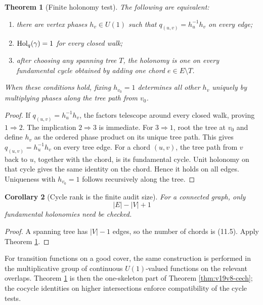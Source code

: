 \documentclass[11pt]{article}
\newtheorem{theorem}{Theorem}[section]
\newtheorem{corollary}[theorem]{Corollary}
\theoremstyle{remark}
\begin{document}
\begin{theorem}[Finite holonomy test]
\label{thm:v19v8-tree}
The following are equivalent:
\begin{enumerate}
 \item there are vertex phases \(h_v\in U(1)\) such that
       \(q_{(u,v)}=h_u^{-1}h_v\) on every edge;
 \item \({\rm Hol}_q(\gamma)=1\) for every closed walk;
 \item after choosing any spanning tree \(T\), the holonomy is one on every
       fundamental cycle obtained by adding one chord \(e\in E\setminus T\).
\end{enumerate}
When these conditions hold, fixing \(h_{v_0}=1\) determines all other
\(h_v\) uniquely by multiplying phases along the tree path from \(v_0\).
\end{theorem}

\begin{proof}
If \(q_{(u,v)}=h_u^{-1}h_v\), the factors telescope around every closed
walk, proving \(1\Rightarrow2\).  The implication \(2\Rightarrow3\) is
immediate.  For \(3\Rightarrow1\), root the tree at \(v_0\) and define
\(h_v\) as the ordered phase product on its unique tree path.  This gives
\(q_{(u,v)}=h_u^{-1}h_v\) on every tree edge.  For a chord \((u,v)\), the
tree path from \(v\) back to \(u\), together with the chord, is its
fundamental cycle.  Unit holonomy on that cycle gives the same identity on
the chord.  Hence it holds on all edges.  Uniqueness with \(h_{v_0}=1\)
follows recursively along the tree.
\end{proof}

\begin{corollary}[Cycle rank is the finite audit size]
\label{cor:v19v8-cycle-rank}
For a connected graph, only
\[
 |E|-|V|+1                                                       \tag{11.5}
\]
fundamental holonomies need be checked.
\end{corollary}

\begin{proof}
A spanning tree has \(|V|-1\) edges, so the number of chords is (11.5).
Apply Theorem \ref{thm:v19v8-tree}.
\end{proof}

For transition functions on a good cover, the same construction is
performed in the multiplicative group of continuous \(U(1)\)-valued
functions on the relevant overlaps.  Theorem \ref{thm:v19v8-tree} is then
the one-skeleton part of Theorem \ref{thm:v19v8-cech}; the cocycle
identities on higher intersections enforce compatibility of the cycle
tests.
\end{document}
